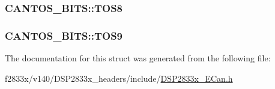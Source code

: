 \subsubsection[{T\+O\+S8}]{ C\+A\+N\+T\+O\+S\+\_\+\+B\+I\+T\+S\+::\+T\+O\+S8}\label{struct_c_a_n_t_o_s___b_i_t_s_a94d659637ec1010ca7ee15e5901c6772}
\hypertarget{struct_c_a_n_t_o_s___b_i_t_s_a1e2301e97b3d5f93e494ced9b6a0e47c}{}
\subsubsection[{T\+O\+S9}]{ C\+A\+N\+T\+O\+S\+\_\+\+B\+I\+T\+S\+::\+T\+O\+S9}\label{struct_c_a_n_t_o_s___b_i_t_s_a1e2301e97b3d5f93e494ced9b6a0e47c}


The documentation for this struct was generated from the following file\+:\begin{DoxyCompactItemize}
\item 
f2833x/v140/\+D\+S\+P2833x\+\_\+headers/include/\hyperlink{_d_s_p2833x___e_can_8h}{D\+S\+P2833x\+\_\+\+E\+Can.\+h}\end{DoxyCompactItemize}
